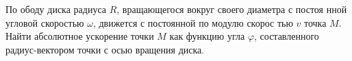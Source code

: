 По ободу диска радиуса $R$, вращающегося вокруг своего диаметра с постоя
нной угловой скоростью $\omega$, движется с постоянной по модулю скорос
тью $v$ точка $M$. Найти абсолютное ускорение точки $M$ как функцию угла
$\varphi$, составленного радиус-вектором точки с осью вращения диска.
